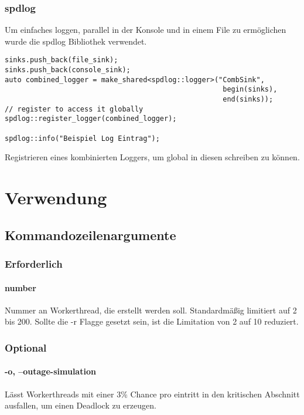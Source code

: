 \documentclass[12pt, letterpaper]{article}
\newenvironment{code}{\captionsetup{type=listing}}{}
\begin{document}
\newpage

\subsubsection{spdlog}
Um einfaches loggen, parallel in der Konsole und in einem File zu ermöglichen wurde die spdlog\cite{spdlog_ref} Bibliothek verwendet. 
\begin{code}
\begin{verbatim}
sinks.push_back(file_sink);
sinks.push_back(console_sink);
auto combined_logger = make_shared<spdlog::logger>("CombSink", 
                                                    begin(sinks), 
                                                    end(sinks));
// register to access it globally
spdlog::register_logger(combined_logger);

spdlog::info("Beispiel Log Eintrag");
\end{verbatim}
\caption{Registrieren eines kombinierten Loggers, um global in diesen schreiben zu können.}
\end{code}

\section{Verwendung}
\label{usage}

\subsection{Kommandozeilenargumente}
\subsubsection{Erforderlich}

\paragraph{number}
Nummer an Workerthread, die erstellt werden soll. Standardmäßig limitiert auf 2 bis 200. Sollte die -r Flagge gesetzt sein, ist die Limitation von 2 auf 10 reduziert.

\subsubsection{Optional}
\paragraph{-o, --outage-simulation}
Lässt Workerthreads mit einer 3\% Chance pro eintritt in den kritischen Abschnitt ausfallen, um einen Deadlock zu erzeugen. 
\end{document}
